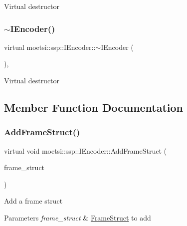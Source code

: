 Virtual destructor \mbox{\label{classmoetsi_1_1ssp_1_1IEncoder_a6c19808ebe6a05dbce630c45188b9346}} 
\subsubsection{\texorpdfstring{$\sim$\+I\+Encoder()}{~IEncoder()}\hspace{0.1cm}{\footnotesize\ttfamily [2/2]}}
{\footnotesize\ttfamily virtual moetsi\+::ssp\+::\+I\+Encoder\+::$\sim$\+I\+Encoder (\begin{DoxyParamCaption}{ }\end{DoxyParamCaption})\hspace{0.3cm}{\ttfamily [inline]}, {\ttfamily [virtual]}}

Virtual destructor 

\subsection{Member Function Documentation}
\mbox{\label{classmoetsi_1_1ssp_1_1IEncoder_a8c223ec82fdd30ee8ee75157306054ec}} 
\subsubsection{\texorpdfstring{Add\+Frame\+Struct()}{AddFrameStruct()}\hspace{0.1cm}{\footnotesize\ttfamily [1/2]}}
{\footnotesize\ttfamily virtual void moetsi\+::ssp\+::\+I\+Encoder\+::\+Add\+Frame\+Struct (\begin{DoxyParamCaption}\item[{std\+::shared\+\_\+ptr$<$ \hyperlink{structmoetsi_1_1ssp_1_1FrameStruct}{Frame\+Struct} $>$ \&}]{frame\+\_\+struct }\end{DoxyParamCaption})\hspace{0.3cm}{\ttfamily [pure virtual]}}

Add a frame struct 
\begin{DoxyParams}{Parameters}
{\em frame\+\_\+struct} & \hyperlink{structmoetsi_1_1ssp_1_1FrameStruct}{Frame\+Struct} to add \\
\hline
\end{DoxyParams}


